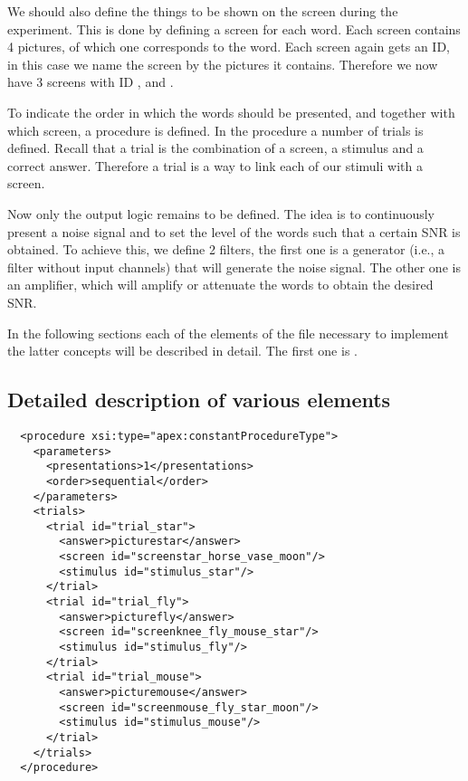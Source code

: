 We should also define the things to be shown on the screen during
the experiment. This is done by defining a screen for each word.
Each screen contains 4 pictures, of which one corresponds to the
word. Each screen again gets an ID, in this case we name the
screen by the pictures it contains. Therefore we now have 3
screens with ID ,
 and .

To indicate the order in which the words should be presented, and
together with which screen, a procedure is defined. In the
procedure a number of trials is defined. Recall that a trial is
the combination of a screen, a stimulus and a correct answer.
Therefore a trial is a way to link each of our stimuli with a
screen.

Now only the output logic remains to be defined. The idea is to
continuously present a noise signal and to set the level of the
words such that a certain SNR is obtained. To achieve this, we
define 2 filters, the first one is a generator (i.e., a filter
without input channels) that will generate the noise signal. The
other one is an amplifier, which will amplify or attenuate the
words to obtain the desired SNR.

In the following sections each of the elements of the 
file necessary to implement the latter concepts will be described
in detail. The first one is .

\subsection{Detailed description of various elements}
\begin{lstlisting}
  <procedure xsi:type="apex:constantProcedureType">
    <parameters>
      <presentations>1</presentations>
      <order>sequential</order>
    </parameters>
    <trials>
      <trial id="trial_star">
        <answer>picturestar</answer>
        <screen id="screenstar_horse_vase_moon"/>
        <stimulus id="stimulus_star"/>
      </trial>
      <trial id="trial_fly">
        <answer>picturefly</answer>
        <screen id="screenknee_fly_mouse_star"/>
        <stimulus id="stimulus_fly"/>
      </trial>
      <trial id="trial_mouse">
        <answer>picturemouse</answer>
        <screen id="screenmouse_fly_star_moon"/>
        <stimulus id="stimulus_mouse"/>
      </trial>
    </trials>
  </procedure>
\end{lstlisting}

